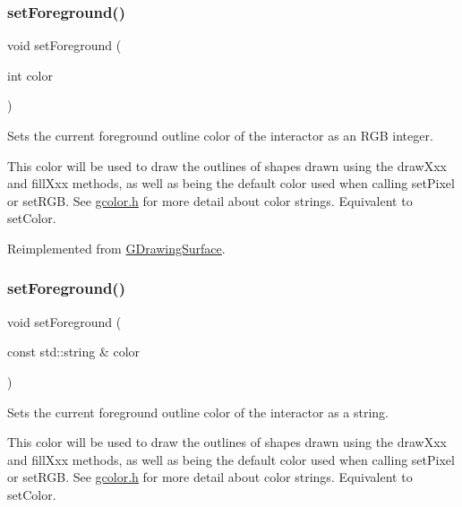 \subsubsection{\texorpdfstring{set\+Foreground()}{setForeground()}\hspace{0.1cm}{\footnotesize\ttfamily [1/2]}}
{\footnotesize\ttfamily void set\+Foreground (\begin{DoxyParamCaption}\item[{int}]{color }\end{DoxyParamCaption})\hspace{0.3cm}{\ttfamily [virtual]}}



Sets the current foreground outline color of the interactor as an R\+GB integer. 

This color will be used to draw the outlines of shapes drawn using the draw\+Xxx and fill\+Xxx methods, as well as being the default color used when calling set\+Pixel or set\+R\+GB. See \mbox{\hyperlink{gcolor_8h_source}{gcolor.\+h}} for more detail about color strings. Equivalent to set\+Color. 

Reimplemented from \mbox{\hyperlink{classGDrawingSurface_a7daa57084b5811b598fce8726660b328}{G\+Drawing\+Surface}}.

\mbox{\label{classGCanvas_a088e04dfc56273df4cedab2b11b970f5}} 
\subsubsection{\texorpdfstring{set\+Foreground()}{setForeground()}\hspace{0.1cm}{\footnotesize\ttfamily [2/2]}}
{\footnotesize\ttfamily void set\+Foreground (\begin{DoxyParamCaption}\item[{const std\+::string \&}]{color }\end{DoxyParamCaption})\hspace{0.3cm}{\ttfamily [virtual]}}



Sets the current foreground outline color of the interactor as a string. 

This color will be used to draw the outlines of shapes drawn using the draw\+Xxx and fill\+Xxx methods, as well as being the default color used when calling set\+Pixel or set\+R\+GB. See \mbox{\hyperlink{gcolor_8h_source}{gcolor.\+h}} for more detail about color strings. Equivalent to set\+Color. 

